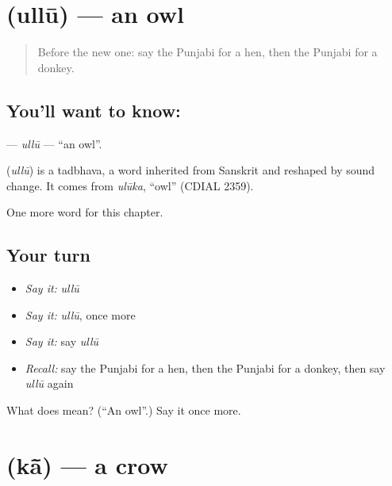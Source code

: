 \section[\texorpdfstring{\pa{ਉੱਲੂ} (ullū)}{ਉੱਲੂ (ullū)}]{ (ullū) — an owl}

\label{lesson:PA-C133-ullu}



\begin{quote}
Before the new one: say the Punjabi for a hen, then the Punjabi for a donkey.
\end{quote}

\subsection*{You'll want to know: }
\textbf{} — \emph{ullū} — \textquotedblleft{}an owl\textquotedblright{}.

\begin{cousinweb}
\textbf{} (\emph{ullū}) is a tadbhava, a word inherited from Sanskrit and reshaped by sound change. It comes from \emph{ulūka}, \textquotedblleft{}owl\textquotedblright{} (CDIAL 2359).
\end{cousinweb}

\begin{grammarlens}[title={What you've built}]
One more word for this chapter.
\end{grammarlens}

\subsection*{Your turn}
\begin{itemize}
\raggedright
  \item \emph{Say it:} \emph{ullū}
  \item \emph{Say it:} \emph{ullū}, once more
  \item \emph{Say it:} say \emph{ullū}
  \item \emph{Recall:} say the Punjabi for a hen, then the Punjabi for a donkey, then say \emph{ullū} again
\end{itemize}

\begin{tcolorbox}[breakable,colback=teal!4,colframe=teal!35!black,title={Before you move on}]
What does  mean? (\textquotedblleft{}An owl\textquotedblright{}.) Say it once more.
\end{tcolorbox}
\section[\texorpdfstring{\pa{ਕਾਂ} (kā̃)}{ਕਾਂ (kā̃)}]{ (kā̃) — a crow}

